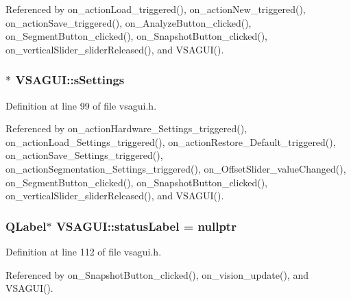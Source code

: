 Referenced by on\+\_\+action\+Load\+\_\+triggered(), on\+\_\+action\+New\+\_\+triggered(), on\+\_\+action\+Save\+\_\+triggered(), on\+\_\+\+Analyze\+Button\+\_\+clicked(), on\+\_\+\+Segment\+Button\+\_\+clicked(), on\+\_\+\+Snapshot\+Button\+\_\+clicked(), on\+\_\+vertical\+Slider\+\_\+slider\+Released(), and V\+S\+A\+G\+U\+I().

\hypertarget{class_v_s_a_g_u_i_a4a0358d00aa3cb520a9a1321962b0d4d}{}
\subsubsection[{s\+Settings}]{$\ast$ V\+S\+A\+G\+U\+I\+::s\+Settings\hspace{0.3cm}{\ttfamily [private]}}\label{class_v_s_a_g_u_i_a4a0358d00aa3cb520a9a1321962b0d4d}


Definition at line 99 of file vsagui.\+h.



Referenced by on\+\_\+action\+Hardware\+\_\+\+Settings\+\_\+triggered(), on\+\_\+action\+Load\+\_\+\+Settings\+\_\+triggered(), on\+\_\+action\+Restore\+\_\+\+Default\+\_\+triggered(), on\+\_\+action\+Save\+\_\+\+Settings\+\_\+triggered(), on\+\_\+action\+Segmentation\+\_\+\+Settings\+\_\+triggered(), on\+\_\+\+Offset\+Slider\+\_\+value\+Changed(), on\+\_\+\+Segment\+Button\+\_\+clicked(), on\+\_\+\+Snapshot\+Button\+\_\+clicked(), on\+\_\+vertical\+Slider\+\_\+slider\+Released(), and V\+S\+A\+G\+U\+I().

\hypertarget{class_v_s_a_g_u_i_a8cbaaa3b5e0975b7a1101b9bef3c9b57}{}
\subsubsection[{status\+Label}]{\setlength{\rightskip}{0pt plus 5cm}Q\+Label$\ast$ V\+S\+A\+G\+U\+I\+::status\+Label = nullptr\hspace{0.3cm}{\ttfamily [private]}}\label{class_v_s_a_g_u_i_a8cbaaa3b5e0975b7a1101b9bef3c9b57}


Definition at line 112 of file vsagui.\+h.



Referenced by on\+\_\+\+Snapshot\+Button\+\_\+clicked(), on\+\_\+vision\+\_\+update(), and V\+S\+A\+G\+U\+I().

